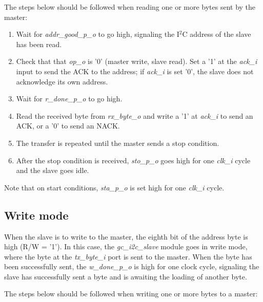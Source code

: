 \documentclass[a4paper,11pt]{article}
\begin{document}
The steps below should be followed when reading one or more bytes sent by the master:

\begin{enumerate}
  \item Wait for \textit{addr\_good\_p\_o} to go high, signaling the I$^2$C address of the slave
    has been read.
  \item Check that that \textit{op\_o} is '0' (master write, slave read). Set a '1' at the
  \textit{ack\_i} input to send the ACK to the address; if \textit{ack\_i} is set '0', the slave
    does not acknowledge its own address.
  \item Wait for \textit{r\_done\_p\_o} to go high.
  \item Read the received byte from \textit{rx\_byte\_o} and write a '1' at \textit{ack\_i}
    to send an ACK, or a '0' to send an NACK.
  \item The transfer is repeated until the master sends a stop condition.
  \item After the stop condition is received, \textit{sto\_p\_o} goes high for one \textit{clk\_i}
    cycle and the slave goes idle.
\end{enumerate}

Note that on start conditions, \textit{sta\_p\_o} is set high for one \textit{clk\_i} cycle.

\subsection{Write mode}

When the slave is to write to the master, the eighth bit of the address byte is high
(R/W = '1'). In this case, the \textit{gc\_i2c\_slave} module goes in write mode, where
the byte at the \textit{tx\_byte\_i} port is sent to the master. When the byte has been
successfully sent, the \textit{w\_done\_p\_o} is high for one clock cycle, signaling the
slave has successfully sent a byte and is awaiting the loading of another byte.

The steps below should be followed when writing one or more bytes to a master:
\end{document}
